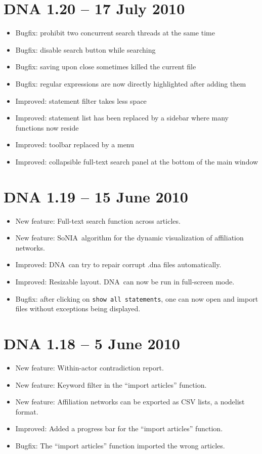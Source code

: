 \documentclass[12pt,a4paper]{scrreprt}
\newcommand{\dnashort}{\textsc{DNA}}
\newcommand{\sonia}{SoNIA}
\newcommand{\code}[1]{\texttt{#1}}
\begin{document}
\section*{DNA 1.20 -- 17 July 2010}
\begin{itemize}
 \item Bugfix: prohibit two concurrent search threads at the same time
 \item Bugfix: disable search button while searching
 \item Bugfix: saving upon close sometimes killed the current file
 \item Bugfix: regular expressions are now directly highlighted after adding them
 \item Improved: statement filter takes less space
 \item Improved: statement list has been replaced by a sidebar where many functions now reside
 \item Improved: toolbar replaced by a menu
 \item Improved: collapsible full-text search panel at the bottom of the main window
\end{itemize}

\section*{DNA 1.19 -- 15 June 2010}
\begin{itemize}
 \item New feature: Full-text search function across articles.
 \item New feature: \sonia\ algorithm for the dynamic visualization of affiliation networks.
 \item Improved: \dnashort\ can try to repair corrupt .dna files automatically.
 \item Improved: Resizable layout. \dnashort\ can now be run in full-screen mode.
 \item Bugfix: after clicking on \code{show all statements}, one can now open and import files without exceptions being displayed.
\end{itemize}

\section*{DNA 1.18 -- 5 June 2010}
\begin{itemize}
 \item New feature: Within-actor contradiction report.
 \item New feature: Keyword filter in the ``import articles'' function.
 \item New feature: Affiliation networks can be exported as CSV lists, a nodelist format.
 \item Improved: Added a progress bar for the ``import articles'' function.
 \item Bugfix: The ``import articles'' function imported the wrong articles.
\end{itemize}
\end{document}
